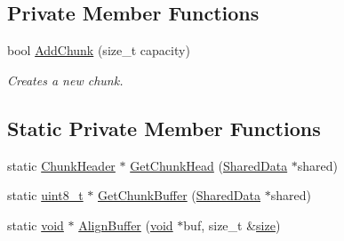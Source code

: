 \subsection*{Private Member Functions}
\begin{DoxyCompactItemize}
\item 
bool \hyperlink{classMemoryPoolAllocator_a41bebe49979dc69921519c7556af18fc}{Add\+Chunk} (size\+\_\+t capacity)
\begin{DoxyCompactList}\small\item\em Creates a new chunk. \end{DoxyCompactList}\end{DoxyCompactItemize}
\subsection*{Static Private Member Functions}
\begin{DoxyCompactItemize}
\item 
static \hyperlink{structMemoryPoolAllocator_1_1ChunkHeader}{Chunk\+Header} $\ast$ \hyperlink{classMemoryPoolAllocator_a2740669a8b5ba8f781bd11c7c3fd988a}{Get\+Chunk\+Head} (\hyperlink{structMemoryPoolAllocator_1_1SharedData}{Shared\+Data} $\ast$shared)
\item 
static \hyperlink{stdint_8h_aba7bc1797add20fe3efdf37ced1182c5}{uint8\+\_\+t} $\ast$ \hyperlink{classMemoryPoolAllocator_a0d325a2c92c347a9e56970e600a388f5}{Get\+Chunk\+Buffer} (\hyperlink{structMemoryPoolAllocator_1_1SharedData}{Shared\+Data} $\ast$shared)
\item 
static \hyperlink{imgui__impl__opengl3__loader_8h_ac668e7cffd9e2e9cfee428b9b2f34fa7}{void} $\ast$ \hyperlink{classMemoryPoolAllocator_afced2c61ee261874a3b45d3343f63eb2}{Align\+Buffer} (\hyperlink{imgui__impl__opengl3__loader_8h_ac668e7cffd9e2e9cfee428b9b2f34fa7}{void} $\ast$buf, size\+\_\+t \&\hyperlink{imgui__impl__opengl3__loader_8h_a3d1e3edfcf61ca2d831883e1afbad89e}{size})
\end{DoxyCompactItemize}

